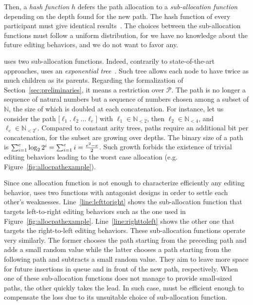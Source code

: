Then, a \emph{hash function} $h$ defers the path allocation to a \emph{sub-allocation
function} depending on the depth found for the new path. The hash function of
every participant must give identical results~\cite{nedelec2013concurrency}.
The choices between the sub-allocation functions must follow a uniform
distribution, for we have no knowledge about the future editing behaviors, and
we do not want to favor any.

\LSEQ uses two sub-allocation functions. Indeed, contrarily to state-of-the-art
approaches, \LSEQ uses an \emph{exponential
  tree}~\cite{andersson1996faster,andersson2007dynamic}. Such tree allows each
node to have twice as much children as its parents. Regarding the formalization
of Section~\ref{sec:preliminaries}, it means a restriction over
$\mathcal{P}$. The path is no longer a sequence of natural numbers but a
sequence of numbers chosen among a subset of $\mathbb{N}$, the size of which is
doubled at each concatenation. For instance, let us consider the path
[$\ell_1.\ell_2\ldots\ell_e$] with $\ell_1\in\mathbb{N}_{<2}$, then
$\ell_2\in \mathbb{N}_{<4}$, and $\ell_{e}\in\mathbb{N}_{<2^e}$. Compared to
constant arity trees, paths require an additional bit per concatenation, for the
subset are growing over depths. The binary size of a path is
$\textstyle\sum\nolimits_{i=1}^{e}\log_2{2^i}=\sum\nolimits_{i=1}^{e}i=
{e^2-e\over{2}}$.
Such growth forbids the existence of trivial editing behaviors leading to the
worst case allocation (e.g. Figure~\ref{fig:allocpathexample}).

Since one allocation function is not enough to characterize efficiently any
editing behavior, \LSEQ uses two functions with antagonist designs in order to
settle each other's weaknesses. Line~\ref{line:lefttoright} shows the
sub-allocation function that targets left-to-right editing behaviors such as the
one used in Figure~\ref{fig:allocpathexample}. Line~\ref{line:righttoleft} shows
the other one that targets the right-to-left editing behaviors. These
sub-allocation functions operate very similarly. The former chooses the
path starting from the preceding path and adds a small random value while the
latter chooses a path starting from the following path and subtracts a small
random value. They aim to leave more space for future insertions in queue and in
front of the new path, respectively.  When one of these sub-allocation functions
does not manage to provide small-sized paths, the other quickly takes the lead. In
such case, \LSEQ must be efficient enough to compensate the loss due to its
unsuitable choice of sub-allocation function.

